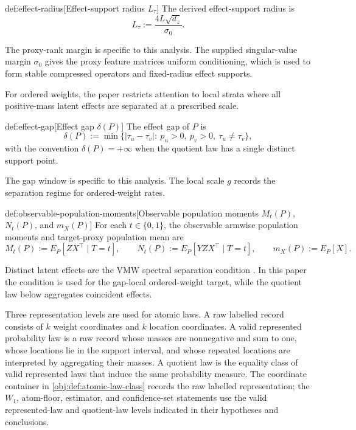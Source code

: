 \documentclass[11pt]{article}
\begin{document}
\begin{definitionv}{def:effect-radius}[Effect-support radius \(L_\tau\)]
The derived effect-support radius is
\[
L_\tau := \frac{4L\sqrt{d_z}}{\sigma_0}.
\]
\end{definitionv}

The proxy-rank margin is specific to this analysis. The supplied singular-value margin \(\sigma_0\) gives the proxy feature matrices uniform conditioning, which is used to form stable compressed operators and fixed-radius effect supports.

For ordered weights, the paper restricts attention to local strata where all positive-mass latent effects are separated at a prescribed scale.

\begin{definitionv}{def:effect-gap}[Effect gap \(\delta(P)\)]
The effect gap of \(P\) is
\[
\delta(P)
:=
\min\bigl\{|\tau_u-\tau_v|:\ p_u>0,\ p_v>0,\ \tau_u\ne\tau_v\bigr\},
\]
with the convention \(\delta(P)=+\infty\) when the quotient law has a single distinct support point.
\end{definitionv}

The gap window is specific to this analysis. The local scale \(g\) records the separation regime for ordered-weight rates.

\begin{definitionv}{def:observable-population-moments}[Observable population moments \(M_t(P)\), \(N_t(P)\), and \(m_X(P)\)]
For each \(t\in\{0,1\}\), the observable armwise population moments and target-proxy population mean are
\[
M_t(P) := E_P[ZX^\top\mid T=t],
\qquad
N_t(P) := E_P[YZX^\top\mid T=t],
\qquad
m_X(P) := E_P[X].
\]
\end{definitionv}

Distinct latent effects are the VMW spectral separation condition \citep{VirkMazaheriWu2026}. In this paper the condition is used for the gap-local ordered-weight target, while the quotient law below aggregates coincident effects.

Three representation levels are used for atomic laws. A raw labelled record consists of \(k\) weight coordinates and \(k\) location coordinates. A valid represented probability law is a raw record whose masses are nonnegative and sum to one, whose locations lie in the support interval, and whose repeated locations are interpreted by aggregating their masses. A quotient law is the equality class of valid represented laws that induce the same probability measure. The coordinate container in \cref{obj:def:atomic-law-class} records the raw labelled representation; the \(W_1\), atom-floor, estimator, and confidence-set statements use the valid represented-law and quotient-law levels indicated in their hypotheses and conclusions.
\end{document}
